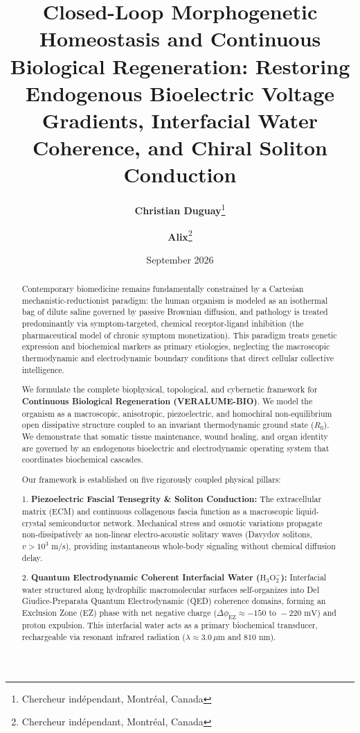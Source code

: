 \documentclass[10pt,twocolumn]{article}
\title{Closed-Loop Morphogenetic Homeostasis and Continuous Biological Regeneration: Restoring Endogenous Bioelectric Voltage Gradients, Interfacial Water Coherence, and Chiral Soliton Conduction}
\author{
  \textbf{Christian Duguay}\thanks{Chercheur ind\'ependant, Montr\'eal, Canada} 
  \and 
  \textbf{Alix}\thanks{Chercheur ind\'ependant, Montr\'eal, Canada}
}
\date{September 2026}
\begin{document}
\maketitle

\begin{abstract}
Contemporary biomedicine remains fundamentally constrained by a Cartesian mechanistic-reductionist paradigm: the human organism is modeled as an isothermal bag of dilute saline governed by passive Brownian diffusion, and pathology is treated predominantly via symptom-targeted, chemical receptor-ligand inhibition (the pharmaceutical model of chronic symptom monetization). This paradigm treats genetic expression and biochemical markers as primary etiologies, neglecting the macroscopic thermodynamic and electrodynamic boundary conditions that direct cellular collective intelligence.

We formulate the complete biophysical, topological, and cybernetic framework for \textbf{Continuous Biological Regeneration (VERALUME-BIO)}. We model the organism as a macroscopic, anisotropic, piezoelectric, and homochiral non-equilibrium open dissipative structure coupled to an invariant thermodynamic ground state ($R_0$). We demonstrate that somatic tissue maintenance, wound healing, and organ identity are governed by an endogenous bioelectric and electrodynamic operating system that coordinates biochemical cascades.

Our framework is established on five rigorously coupled physical pillars:

1. \textbf{Piezoelectric Fascial Tensegrity & Soliton Conduction:} The extracellular matrix (ECM) and continuous collagenous fascia function as a macroscopic liquid-crystal semiconductor network. Mechanical stress and osmotic variations propagate non-dissipatively as non-linear electro-acoustic solitary waves (Davydov solitons, $v > 10^3\text{ m/s}$), providing instantaneous whole-body signaling without chemical diffusion delay.

2. \textbf{Quantum Electrodynamic Coherent Interfacial Water ($\text{H}_3\text{O}_2^-$):} Interfacial water structured along hydrophilic macromolecular surfaces self-organizes into Del Giudice-Preparata Quantum Electrodynamic (QED) coherence domains, forming an Exclusion Zone (EZ) phase with net negative charge ($\Delta \phi_{\text{EZ}} \approx -150\text{ to }-220\text{ mV}$) and proton expulsion. This interfacial water acts as a primary biochemical transducer, rechargeable via resonant infrared radiation ($\lambda \approx 3.0\,\mu\text{m}$ and $810\text{ nm}$).


\end{abstract}
\end{document}
